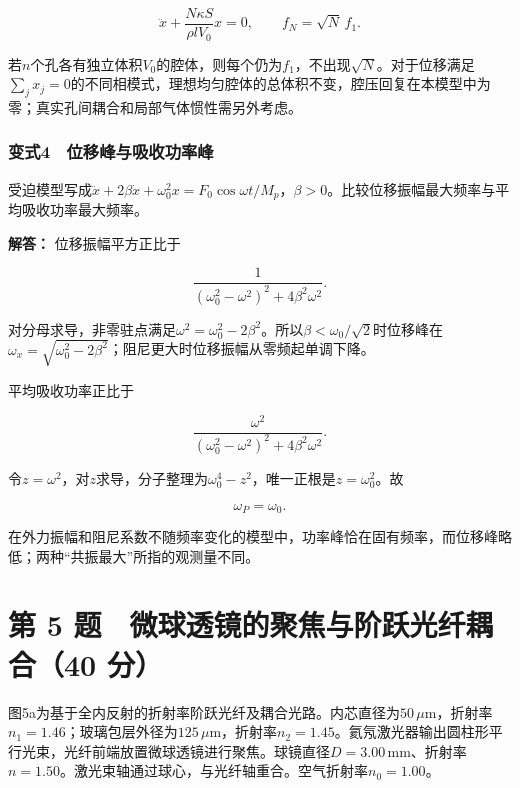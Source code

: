 \documentclass[12pt,a4paper,fontset=fandol]{ctexart}
\begin{document}
\[
\ddot x+\frac{N\kappa S}{\rho lV_0}x=0,
\qquad
\boxed{f_N=\sqrt N\,f_1}.
\]

若\(n\)个孔各有独立体积\(V_0\)的腔体，则每个仍为\(f_1\)，不出现\(\sqrt N\)。对于位移满足\(\sum_jx_j=0\)的不同相模式，理想均匀腔体的总体积不变，腔压回复在本模型中为零；真实孔间耦合和局部气体惯性需另外考虑。

\par\noindent\begin{minipage}{\linewidth}
\subsubsection{变式4　位移峰与吸收功率峰}\label{ux53d8ux5f0f4-ux4f4dux79fbux5cf0ux4e0eux5438ux6536ux529fux7387ux5cf0}

受迫模型写成\(\ddot x+2\beta\dot x+\omega_0^2x=F_0\cos\omega t/M_p\)，\(\beta>0\)。比较位移振幅最大频率与平均吸收功率最大频率。

\textbf{解答：} 位移振幅平方正比于

\[
\frac1{(\omega_0^2-\omega^2)^2+4\beta^2\omega^2}.
\]

对分母求导，非零驻点满足\(\omega^2=\omega_0^2-2\beta^2\)。所以\(\beta<\omega_0/\sqrt2\)时位移峰在\(\omega_x=\sqrt{\omega_0^2-2\beta^2}\)；阻尼更大时位移振幅从零频起单调下降。

平均吸收功率正比于

\[
\frac{\omega^2}
{(\omega_0^2-\omega^2)^2+4\beta^2\omega^2}.
\]

令\(z=\omega^2\)，对\(z\)求导，分子整理为\(\omega_0^4-z^2\)，唯一正根是\(z=\omega_0^2\)。故

\[
\boxed{\omega_P=\omega_0}.
\]

在外力振幅和阻尼系数不随频率变化的模型中，功率峰恰在固有频率，而位移峰略低；两种``共振最大''所指的观测量不同。

\end{minipage}\par
\clearpage

\section{第 5 题　微球透镜的聚焦与阶跃光纤耦合（40
分）}\label{ux7b2c-5-ux9898-ux5faeux7403ux900fux955cux7684ux805aux7126ux4e0eux9636ux8dc3ux5149ux7ea4ux8026ux540840-ux5206}

图5a为基于全内反射的折射率阶跃光纤及耦合光路。内芯直径为\(50\,\mu\mathrm m\)，折射率\(n_1=1.46\)；玻璃包层外径为\(125\,\mu\mathrm m\)，折射率\(n_2=1.45\)。氦氖激光器输出圆柱形平行光束，光纤前端放置微球透镜进行聚焦。球镜直径\(D=3.00\,\mathrm{mm}\)、折射率\(n=1.50\)。激光束轴通过球心，与光纤轴重合。空气折射率\(n_0=1.00\)。
\end{document}
